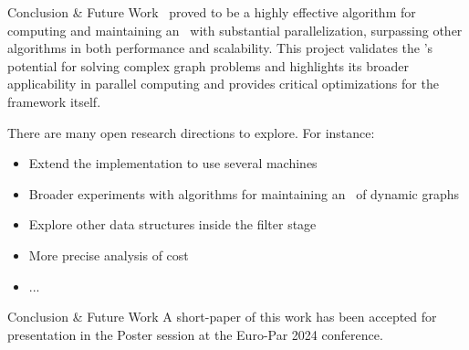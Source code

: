 \begin{frame}{Conclusion \& Future Work} \justifying
    \DPmst\ proved to be a highly effective algorithm for computing and maintaining an \mst\ with substantial parallelization, surpassing other algorithms in both performance and scalability. This project validates the \dpm's potential for solving complex graph problems and highlights its broader applicability in parallel computing and provides critical optimizations for the framework itself.
    
    There are many open research directions to explore. For instance:
    \begin{itemize}
        \item Extend the implementation to use several machines
        \item Broader experiments with algorithms for maintaining an \mst\ of dynamic graphs
        \item Explore other data structures inside the filter stage
        \item More precise analysis of cost
        \item ...
    \end{itemize}
\end{frame}


\begin{frame}{Conclusion \& Future Work} \justifying
    A short-paper of this work has been accepted for presentation in the Poster session at the Euro-Par 2024 conference.
\end{frame}
